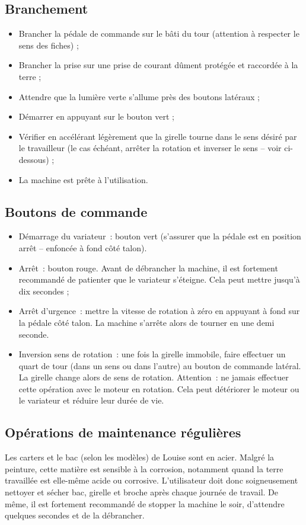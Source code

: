 \documentclass[a4paper]{article}
\begin{document}
\subsection{Branchement}
\begin{itemize}
\item Brancher la pédale de commande sur le bâti du tour (attention à respecter le sens des fiches) ;
\item Brancher la prise sur une prise de courant dûment protégée et raccordée à la terre ;
\item Attendre que la lumière verte s’allume près des boutons latéraux ;
\item Démarrer en appuyant sur le bouton vert ;
\item Vérifier en accélérant légèrement que la girelle tourne dans le sens désiré par le travailleur (le cas
échéant, arrêter la rotation et inverser le sens – voir ci-dessous) ;
\item La machine est prête à l’utilisation.
\end{itemize}

\subsection{Boutons de commande}
\begin{itemize}
\item Démarrage du variateur~: bouton vert (s’assurer que la pédale est en position arrêt – enfoncée à
fond côté talon).
\item Arrêt~: bouton rouge. Avant de débrancher la machine, il est fortement recommandé de patienter
que le variateur s’éteigne. Cela peut mettre jusqu’à dix secondes ;
\item Arrêt d’urgence~: mettre la vitesse de rotation à zéro en appuyant à fond sur la pédale côté talon. La
machine s’arrête alors de tourner en une demi seconde.
\item Inversion sens de rotation~: une fois la girelle immobile, faire effectuer un quart de tour (dans un
sens ou dans l’autre) au bouton de commande latéral. La girelle change alors de sens de rotation.
Attention~: ne jamais effectuer cette opération avec le moteur en rotation. Cela peut détériorer le
moteur ou le variateur et réduire leur durée de vie.
\end{itemize}

\subsection{Opérations de maintenance régulières}
Les carters et le bac (selon les modèles) de Louise sont en acier. Malgré la peinture, cette matière est sensible à la
corrosion, notamment quand la terre travaillée est elle-même acide ou corrosive.
L’utilisateur doit donc soigneusement nettoyer et sécher bac, girelle et broche après chaque journée
de travail. De même, il est fortement recommandé de stopper la machine le soir, d’attendre quelques
secondes et de la débrancher.
\end{document}
